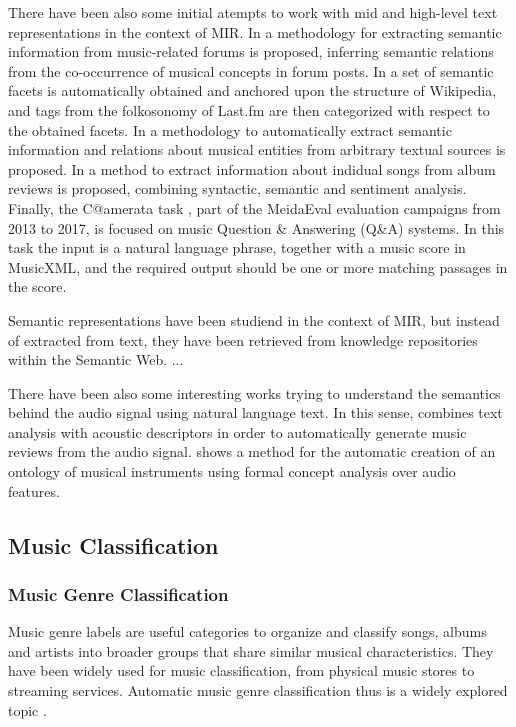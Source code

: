 There have been also some initial atempts to work with mid and high-level text representations in the context of MIR. In \cite{Sordo2012} a methodology for extracting semantic information from music-related forums is proposed, inferring semantic relations from the co-occurrence of musical concepts in forum posts. 
In \cite{Sordo2013} a set of semantic facets is automatically obtained and anchored upon the structure of Wikipedia, and tags from the folkosonomy of Last.fm are then categorized with respect to the obtained facets. 
In \cite{Knees2011} a methodology to automatically extract semantic information and relations about musical entities from arbitrary textual sources is proposed. In \cite{TataandDiEugenio2010} a method to extract information about indidual songs from album reviews is proposed, combining syntactic, semantic and sentiment analysis. Finally, the C@amerata task \cite{sutcliffe2016c, sutcliffe2015}, part of the MeidaEval evaluation campaigns from 2013 to 2017, is focused on music Question \& Answering (Q\&A) systems. In this task the input is a natural language phrase, together with a music score in MusicXML, and the required output should be one or more matching passages in the score.

Semantic representations have been studiend in the context of MIR, but instead of extracted from text, they have been retrieved from knowledge repositories within the Semantic Web. ...

There have been also some interesting works trying to understand the semantics behind the audio signal using natural language text. In this sense, \cite{Whitman2004} combines text analysis with acoustic descriptors in order to automatically generate music reviews from the audio signal. \cite{Kolozali2013} shows a method for the automatic creation of an ontology of musical instruments using formal concept analysis over audio features. 


\subsection{Music Classification}
\label{sec:SOA:mir:classfication}



\subsubsection{Music Genre Classification}

Music genre labels are useful categories to organize and classify songs, albums and artists into broader groups that share similar musical characteristics. They have been widely used for music classification, from physical music stores to streaming services. Automatic music genre classification thus is a widely explored topic \citep{sturm2012survey}.

